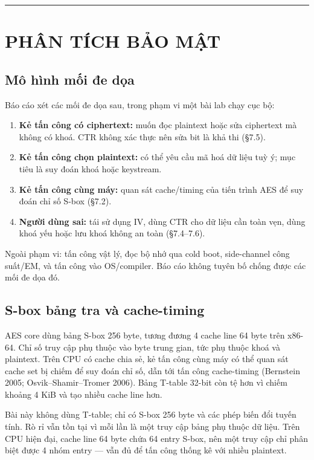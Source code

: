 \documentclass[12pt,a4paper,oneside]{report}
\let\origtexttt\texttt
\renewcommand{\texttt}[1]{\origtexttt{\seqsplit{#1}}}
\begin{document}
\par\noindent\rule{\textwidth}{0.4pt}


\chapter{PHÂN TÍCH BẢO MẬT}


\section{Mô hình mối đe dọa}


Báo cáo xét các mối đe dọa sau, trong phạm vi một bài lab chạy cục bộ:


\begin{enumerate}[leftmargin=*]
\item \textbf{Kẻ tấn công có ciphertext:} muốn đọc plaintext hoặc sửa ciphertext mà không có khoá. CTR không xác thực nên sửa bit là khả thi (§7.5).
\item \textbf{Kẻ tấn công chọn plaintext:} có thể yêu cầu mã hoá dữ liệu tuỳ ý; mục tiêu là suy đoán khoá hoặc keystream.
\item \textbf{Kẻ tấn công cùng máy:} quan sát cache/timing của tiến trình AES để suy đoán chỉ số S-box (§7.2).
\item \textbf{Người dùng sai:} tái sử dụng IV, dùng CTR cho dữ liệu cần toàn vẹn, dùng khoá yếu hoặc lưu khoá không an toàn (§7.4–7.6).
\end{enumerate}


Ngoài phạm vi: tấn công vật lý, đọc bộ nhớ qua cold boot, side-channel công suất/EM, và tấn công vào OS/compiler. Báo cáo không tuyên bố chống được các mối đe dọa đó.


\section{S-box bảng tra và cache-timing}


AES core dùng bảng S-box 256 byte, tương đương 4 cache line 64 byte trên x86-64. Chỉ số truy cập phụ thuộc vào byte trung gian, tức phụ thuộc khoá và plaintext. Trên CPU có cache chia sẻ, kẻ tấn công cùng máy có thể quan sát cache set bị chiếm để suy đoán chỉ số, dẫn tới tấn công cache-timing (Bernstein 2005; Osvik–Shamir–Tromer 2006). Bảng T-table 32-bit còn tệ hơn vì chiếm khoảng 4 KiB và tạo nhiều cache line hơn.


Bài này không dùng T-table; chỉ có S-box 256 byte và các phép biến đổi tuyến tính. Rò rỉ vẫn tồn tại vì mỗi lần \texttt{SubBytes} là một truy cập bảng phụ thuộc dữ liệu. Trên CPU hiện đại, cache line 64 byte chứa 64 entry S-box, nên một truy cập chỉ phân biệt được 4 nhóm entry — vẫn đủ để tấn công thống kê với nhiều plaintext.
\end{document}

